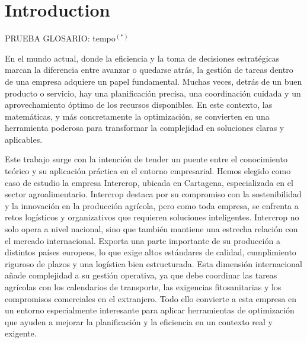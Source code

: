 \chapter*{Introduction}

PRUEBA GLOSARIO: \gls{tempo}$^{(*)}$


En el mundo actual, donde la eficiencia y la toma de decisiones estratégicas marcan la diferencia entre avanzar o quedarse atrás, la gestión de tareas dentro de una empresa adquiere un papel fundamental.
Muchas veces, detrás de un buen producto o servicio, hay una planificación precisa, una coordinación cuidada y un aprovechamiento óptimo de los recursos disponibles.
En este contexto, las matemáticas, y más concretamente la optimización, se convierten en una herramienta poderosa para transformar la complejidad en soluciones claras y aplicables.

Este trabajo surge con la intención de tender un puente entre el conocimiento teórico y su aplicación práctica en el entorno empresarial.
Hemos elegido como caso de estudio la empresa Intercrop, ubicada en Cartagena, especializada en el sector agroalimentario.
Intercrop destaca por su compromiso con la sostenibilidad y la innovación en la producción agrícola, pero como toda empresa, se enfrenta a retos logísticos y organizativos que requieren soluciones inteligentes.
Intercrop no solo opera a nivel nacional, sino que también mantiene una estrecha relación con el mercado internacional. 
Exporta una parte importante de su producción a distintos países europeos, lo que exige altos estándares de calidad, cumplimiento riguroso de plazos y una logística bien estructurada.
Esta dimensión internacional añade complejidad a su gestión operativa, ya que debe coordinar las tareas agrícolas con los calendarios de transporte, las exigencias fitosanitarias y los compromisos comerciales en el extranjero.
Todo ello convierte a esta empresa en un entorno especialmente interesante para aplicar herramientas de optimización que ayuden a mejorar la planificación y la eficiencia en un contexto real y exigente.

